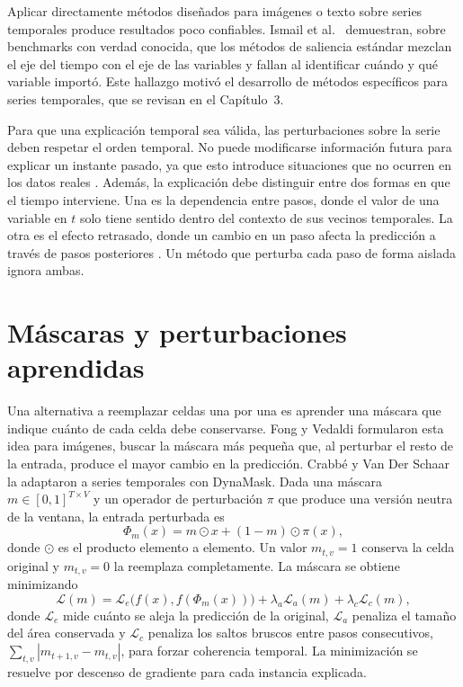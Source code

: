 Aplicar directamente métodos diseñados para imágenes o texto sobre series temporales produce resultados poco confiables. Ismail et al.\ \cite{ismail2020} demuestran, sobre benchmarks con verdad conocida, que los métodos de saliencia estándar mezclan el eje del tiempo con el eje de las variables y fallan al identificar cuándo y qué variable importó. Este hallazgo motivó el desarrollo de métodos específicos para series temporales, que se revisan en el Capítulo~3.

Para que una explicación temporal sea válida, las perturbaciones sobre la serie deben respetar el orden temporal. No puede modificarse información futura para explicar un instante pasado, ya que esto introduce situaciones que no ocurren en los datos reales \cite{tonekaboni2020, crabbe2021}. Además, la explicación debe distinguir entre dos formas en que el tiempo interviene. Una es la dependencia entre pasos, donde el valor de una variable en $t$ solo tiene sentido dentro del contexto de sus vecinos temporales. La otra es el efecto retrasado, donde un cambio en un paso afecta la predicción a través de pasos posteriores \cite{leung2023winit}. Un método que perturba cada paso de forma aislada ignora ambas.

\section{Máscaras y perturbaciones aprendidas}
\label{sec:mt_mascaras}

Una alternativa a reemplazar celdas una por una es aprender una máscara que indique cuánto de cada celda debe conservarse. Fong y Vedaldi \cite{fong2017} formularon esta idea para imágenes, buscar la máscara más pequeña que, al perturbar el resto de la entrada, produce el mayor cambio en la predicción. Crabbé y Van Der Schaar \cite{crabbe2021} la adaptaron a series temporales con DynaMask. Dada una máscara $m \in [0,1]^{T \times V}$ y un operador de perturbación $\pi$ que produce una versión neutra de la ventana, la entrada perturbada es
\begin{equation}
    \Phi_m(x) = m \odot x + (1 - m) \odot \pi(x),
\end{equation}
donde $\odot$ es el producto elemento a elemento. Un valor $m_{t,v}=1$ conserva la celda original y $m_{t,v}=0$ la reemplaza completamente. La máscara se obtiene minimizando
\begin{equation}
    \mathcal{L}(m) = \mathcal{L}_e\big(f(x), f(\Phi_m(x))\big) + \lambda_a \mathcal{L}_a(m) + \lambda_c \mathcal{L}_c(m),
\end{equation}
donde $\mathcal{L}_e$ mide cuánto se aleja la predicción de la original, $\mathcal{L}_a$ penaliza el tamaño del área conservada y $\mathcal{L}_c$ penaliza los saltos bruscos entre pasos consecutivos, $\sum_{t,v} |m_{t+1,v} - m_{t,v}|$, para forzar coherencia temporal. La minimización se resuelve por descenso de gradiente para cada instancia explicada.

